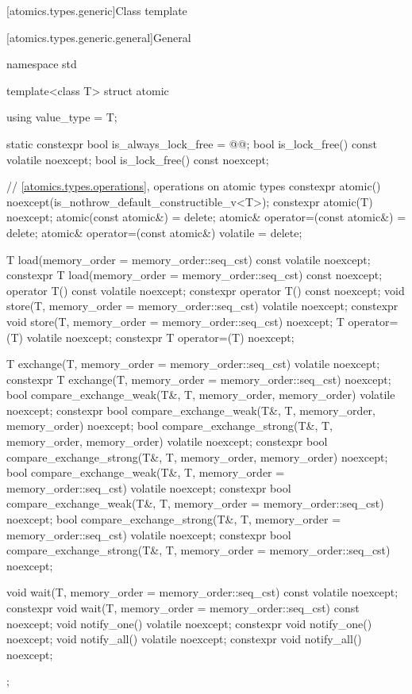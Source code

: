 [atomics.types.generic]{Class template }

[atomics.types.generic.general]{General}

%
%
\begin{codeblock}
namespace std {
  template<class T> struct atomic {
    using value_type = T;

    static constexpr bool is_always_lock_free = @@;
    bool is_lock_free() const volatile noexcept;
    bool is_lock_free() const noexcept;

    // \ref{atomics.types.operations}, operations on atomic types
    constexpr atomic() noexcept(is_nothrow_default_constructible_v<T>);
    constexpr atomic(T) noexcept;
    atomic(const atomic&) = delete;
    atomic& operator=(const atomic&) = delete;
    atomic& operator=(const atomic&) volatile = delete;

    T load(memory_order = memory_order::seq_cst) const volatile noexcept;
    constexpr T load(memory_order = memory_order::seq_cst) const noexcept;
    operator T() const volatile noexcept;
    constexpr operator T() const noexcept;
    void store(T, memory_order = memory_order::seq_cst) volatile noexcept;
    constexpr void store(T, memory_order = memory_order::seq_cst) noexcept;
    T operator=(T) volatile noexcept;
    constexpr T operator=(T) noexcept;

    T exchange(T, memory_order = memory_order::seq_cst) volatile noexcept;
    constexpr T exchange(T, memory_order = memory_order::seq_cst) noexcept;
    bool compare_exchange_weak(T&, T, memory_order, memory_order) volatile noexcept;
    constexpr bool compare_exchange_weak(T&, T, memory_order, memory_order) noexcept;
    bool compare_exchange_strong(T&, T, memory_order, memory_order) volatile noexcept;
    constexpr bool compare_exchange_strong(T&, T, memory_order, memory_order) noexcept;
    bool compare_exchange_weak(T&, T, memory_order = memory_order::seq_cst) volatile noexcept;
    constexpr bool compare_exchange_weak(T&, T, memory_order = memory_order::seq_cst) noexcept;
    bool compare_exchange_strong(T&, T, memory_order = memory_order::seq_cst) volatile noexcept;
    constexpr bool compare_exchange_strong(T&, T, memory_order = memory_order::seq_cst) noexcept;

    void wait(T, memory_order = memory_order::seq_cst) const volatile noexcept;
    constexpr void wait(T, memory_order = memory_order::seq_cst) const noexcept;
    void notify_one() volatile noexcept;
    constexpr void notify_one() noexcept;
    void notify_all() volatile noexcept;
    constexpr void notify_all() noexcept;
  };
}
\end{codeblock}

